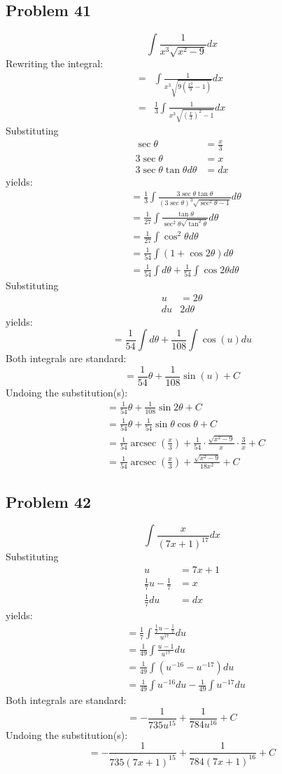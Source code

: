 \documentclass{article}
\DeclareMathOperator{\arcsec}{arcsec}
\begin{document}
\subsection*{Problem 41}
$$\int\frac{1}{x^3\sqrt{x^2-9}}dx$$
Rewriting the integral:
\begin{align*}
=&\int\frac{1}{x^3\sqrt{9\left(\frac{x^2}{9}-1\right)}}dx \\
=&\frac{1}{3}\int\frac{1}{x^3\sqrt{\left(\frac{x}{3}\right)^2-1}}dx
\end{align*}
Substituting
\begin{align*}
\sec\theta&=\frac{x}{3} \\
3\sec\theta&=x \\
3\sec\theta\tan\theta d\theta&=dx
\end{align*}
yields:
\begin{align*}
&=\frac{1}{3}\int\frac{3\sec\theta\tan\theta}{(3\sec\theta)^3\sqrt{\sec^2\theta-1}}d\theta \\
&=\frac{1}{27}\int\frac{\tan\theta}{\sec^2\theta\sqrt{\tan^2\theta}}d\theta \\
&=\frac{1}{27}\int\cos^2\theta d\theta \\
&=\frac{1}{54}\int\left(1+\cos2\theta\right)d\theta \\
&=\frac{1}{54}\int d\theta+\frac{1}{54}\int\cos2\theta d\theta
\end{align*}
Substituting
\begin{align*}
u&=2\theta \\
du&2d\theta
\end{align*}
yields:
$$=\frac{1}{54}\int d\theta+\frac{1}{108}\int\cos(u)du$$
Both integrals are standard:
$$=\frac{1}{54}\theta+\frac{1}{108}\sin(u)+C$$
Undoing the substitution(s):
\begin{align*}
&=\frac{1}{54}\theta+\frac{1}{108}\sin2\theta+C \\
&=\frac{1}{54}\theta+\frac{1}{54}\sin\theta\cos\theta+C \\
&=\frac{1}{54}\arcsec\left(\frac{x}{3}\right)+\frac{1}{54}\cdot\frac{\sqrt{x^2-9}}{x}\cdot\frac{3}{x}+C \\
&=\frac{1}{54}\arcsec\left(\frac{x}{3}\right)+\frac{\sqrt{x^2-9}}{18x^2}+C
\end{align*}
\subsection*{Problem 42}
$$\int\frac{x}{\left(7x+1\right)^{17}}dx$$
Substituting
\begin{align*}
u&=7x+1 \\
\frac{1}{7}u-\frac{1}{7}&=x \\
\frac{1}{7}du&=dx
\end{align*}
yields:
\begin{align*}
&=\frac{1}{7}\int\frac{\frac{1}{7}u-\frac{1}{7}}{u^{17}}du \\
&=\frac{1}{49}\int\frac{u-1}{u^{17}}du \\
&=\frac{1}{49}\int\left(u^{-16}-u^{-17}\right)du \\
&=\frac{1}{49}\int u^{-16}du-\frac{1}{49}\int u^{-17}du
\end{align*}
Both integrals are standard:
$$=-\frac{1}{735u^{15}}+\frac{1}{784u^{16}}+C$$
Undoing the substitution(s):
$$=-\frac{1}{735(7x+1)^{15}}+\frac{1}{784(7x+1)^{16}}+C$$
\end{document}
